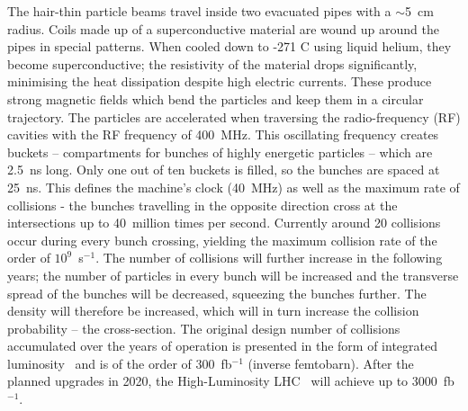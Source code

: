 \begin{description}
The hair-thin particle beams travel inside two evacuated pipes with a $\sim$5~cm radius. Coils made up of a superconductive material are wound up around the pipes in special patterns. When cooled down to -271 \textdegree C using liquid helium, they become superconductive; the resistivity of the material drops significantly, minimising the heat dissipation despite high electric currents. These produce strong magnetic fields which bend the particles and keep them in a circular trajectory. The particles are accelerated when traversing the radio-frequency (RF) cavities with the RF frequency of 400~MHz. This oscillating frequency creates buckets -- compartments for bunches of highly energetic particles -- which are 2.5~ns long. Only one out of ten buckets is filled, so the bunches are spaced at 25~ns. This defines the machine's clock (40~MHz) as well as the maximum rate of collisions - the bunches travelling in the opposite direction cross at the intersections up to 40~million times per second. Currently around 20 collisions occur during every bunch crossing, yielding the maximum collision rate of the order of $10^9$~s$^{-1}$. The number of collisions will further increase in the following years; the number of particles in every bunch will be increased and the transverse spread of the bunches will be decreased, squeezing the bunches further. The density will therefore be increased, which will in turn increase the collision probability -- the cross-section. The original design number of collisions accumulated over the years of operation is presented in the form of integrated luminosity~\cite{} and is of the order of 300~fb$^{-1}$ (inverse femtobarn). After the planned upgrades in 2020, the High-Luminosity LHC~\cite{} will achieve up to 3000~fb$^{-1}$.
\end{description}

